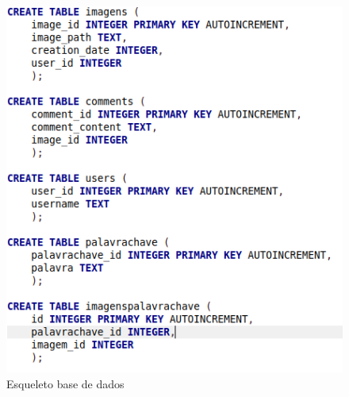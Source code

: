\documentclass{report}
\begin{document}
\FloatBarrier
\begin{figure}[H]
    \includegraphics[scale=0.5]{basededados.png}
    \caption{Esqueleto base de dados}
    \label{fig:my_label}
\end{figure}
\end{document}
